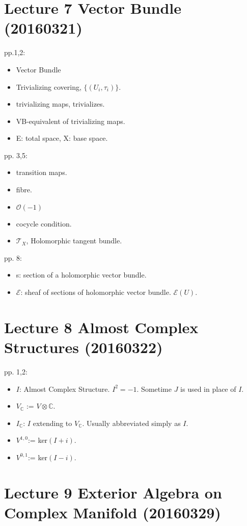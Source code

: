 \section{Lecture 7 Vector Bundle (20160321)}
pp.1,2:
\begin{itemize}
    \item Vector Bundle
    \item Trivializing covering, $\{(U_i,\tau_i)\}$.
    \item trivializing maps, trivializes.
    \item VB-equivalent of trivializing maps.
    \item E: total space, X: base space.
\end{itemize}
pp. 3,5:
\begin{itemize}
    \item transition maps.
    \item fibre.
    \item $\mathcal{O}(-1)$
    \item cocycle condition.
    \item $\mathcal{T}_X$, Holomorphic tangent bundle.
\end{itemize}
pp. 8:
\begin{itemize}
    \item s: section of a holomorphic vector bundle.
    \item $\mathcal{E}$: sheaf of sections of holomorphic vector bundle. $\mathcal{E}(U)$.
\end{itemize}
	
\section{Lecture 8 Almost Complex Structures (20160322)}
pp. 1,2:
\begin{itemize}
    \item $I$: Almost Complex Structure. $I^2=-1$. Sometime $J$ is used in place of $I$.
    \item $V_{\mathbb{C}}$ := $V\otimes \mathbb{C}$.
    \item $I_\mathbb{C}$: $I$ extending to $V_{\mathbb{C}}$. Usually abbreviated simply as $I$.
    \item $V^{1,0}$:= ker$(I+i)$.
    \item $V^{0,1}$:= ker$(I-i)$.
\end{itemize}
	
\section{Lecture 9 Exterior Algebra on Complex Manifold (20160329)}

